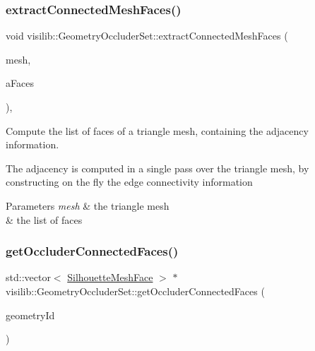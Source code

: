 \subsubsection{\texorpdfstring{extractConnectedMeshFaces()}{extractConnectedMeshFaces()}}
{\footnotesize\ttfamily void visilib\+::\+Geometry\+Occluder\+Set\+::extract\+Connected\+Mesh\+Faces (\begin{DoxyParamCaption}\item[{\mbox{\hyperlink{structvisilib_1_1_geometry_discrete_mesh_description}{Geometry\+Discrete\+Mesh\+Description}} $\ast$}]{mesh,  }\item[{std\+::vector$<$ \mbox{\hyperlink{classvisilib_1_1_silhouette_mesh_face}{Silhouette\+Mesh\+Face}} $>$ \&}]{a\+Faces }\end{DoxyParamCaption})\hspace{0.3cm}{\ttfamily [inline]}, {\ttfamily [private]}}



Compute the list of faces of a triangle mesh, containing the adjacency information. 

The adjacency is computed in a single pass over the triangle mesh, by constructing on the fly the edge connectivity information


\begin{DoxyParams}{Parameters}
{\em mesh} & the triangle mesh \\
\hline
{\em } & the list of faces \\
\hline
\end{DoxyParams}
\mbox{\label{classvisilib_1_1_geometry_occluder_set_a48bcbc4a98511777faf8fa006343d6a3}} 
\subsubsection{\texorpdfstring{getOccluderConnectedFaces()}{getOccluderConnectedFaces()}}
{\footnotesize\ttfamily std\+::vector$<$ \mbox{\hyperlink{classvisilib_1_1_silhouette_mesh_face}{Silhouette\+Mesh\+Face}} $>$ $\ast$ visilib\+::\+Geometry\+Occluder\+Set\+::get\+Occluder\+Connected\+Faces (\begin{DoxyParamCaption}\item[{size\+\_\+t}]{geometry\+Id }\end{DoxyParamCaption})\hspace{0.3cm}{\ttfamily [inline]}}



